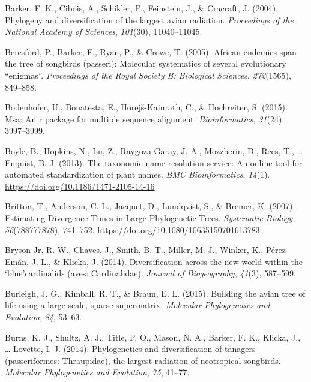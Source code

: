 \documentclass[english,man]{apa6}
\begin{document}
\leavevmode\hypertarget{ref-barker2004phylogeny}{}%
Barker, F. K., Cibois, A., Schikler, P., Feinstein, J., \& Cracraft, J. (2004). Phylogeny and diversification of the largest avian radiation. \emph{Proceedings of the National Academy of Sciences}, \emph{101}(30), 11040--11045.

\leavevmode\hypertarget{ref-beresford2005african}{}%
Beresford, P., Barker, F., Ryan, P., \& Crowe, T. (2005). African endemics span the tree of songbirds (passeri): Molecular systematics of several evolutionary ``enigmas''. \emph{Proceedings of the Royal Society B: Biological Sciences}, \emph{272}(1565), 849--858.

\leavevmode\hypertarget{ref-bodenhofer2015msa}{}%
Bodenhofer, U., Bonatesta, E., Horejš-Kainrath, C., \& Hochreiter, S. (2015). Msa: An r package for multiple sequence alignment. \emph{Bioinformatics}, \emph{31}(24), 3997--3999.

\leavevmode\hypertarget{ref-Boyle2013}{}%
Boyle, B., Hopkins, N., Lu, Z., Raygoza Garay, J. A., Mozzherin, D., Rees, T., \ldots{} Enquist, B. J. (2013). The taxonomic name resolution service: An online tool for automated standardization of plant names. \emph{BMC Bioinformatics}, \emph{14}(1). \url{https://doi.org/10.1186/1471-2105-14-16}

\leavevmode\hypertarget{ref-Britton2007}{}%
Britton, T., Anderson, C. L., Jacquet, D., Lundqvist, S., \& Bremer, K. (2007). Estimating Divergence Times in Large Phylogenetic Trees. \emph{Systematic Biology}, \emph{56}(788777878), 741--752. \url{https://doi.org/10.1080/10635150701613783}

\leavevmode\hypertarget{ref-bryson2014diversification}{}%
Bryson Jr, R. W., Chaves, J., Smith, B. T., Miller, M. J., Winker, K., Pérez-Emán, J. L., \& Klicka, J. (2014). Diversification across the new world within the `blue'cardinalids (aves: Cardinalidae). \emph{Journal of Biogeography}, \emph{41}(3), 587--599.

\leavevmode\hypertarget{ref-burleigh2015building}{}%
Burleigh, J. G., Kimball, R. T., \& Braun, E. L. (2015). Building the avian tree of life using a large-scale, sparse supermatrix. \emph{Molecular Phylogenetics and Evolution}, \emph{84}, 53--63.

\leavevmode\hypertarget{ref-burns2014phylogenetics}{}%
Burns, K. J., Shultz, A. J., Title, P. O., Mason, N. A., Barker, F. K., Klicka, J., \ldots{} Lovette, I. J. (2014). Phylogenetics and diversification of tanagers (passeriformes: Thraupidae), the largest radiation of neotropical songbirds. \emph{Molecular Phylogenetics and Evolution}, \emph{75}, 41--77.
\end{document}
